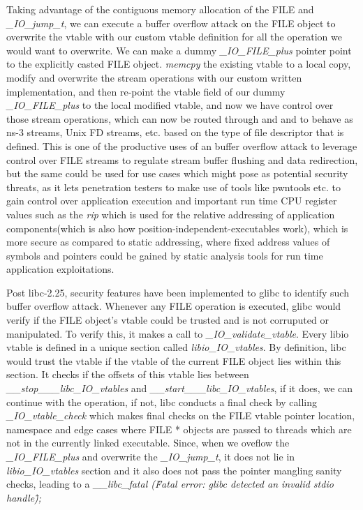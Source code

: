 \documentclass{sig-alternate}
\begin{document}
Taking advantage of the contiguous memory allocation of the FILE and \textit{\_IO\_jump\_t}, we can execute a buffer overflow attack on the FILE object 
to overwrite the vtable with our custom vtable definition for all the operation we would want to overwrite. We can make a dummy \textit{\_IO\_FILE\_plus} 
pointer point to the explicitly casted FILE object. \textit{memcpy} the existing vtable to a local copy, modify and overwrite the stream operations with our 
custom written implementation, and then re-point the vtable field of our dummy \textit{\_IO\_FILE\_plus} to the local modified vtable, and now we have 
control over those stream operations, which can now be routed through and and to behave as ns-3 streams, Unix FD streams, etc. based on the type of file 
descriptor that is defined. This is one of the productive uses of an buffer overflow attack to leverage control over FILE streams to regulate stream 
buffer flushing and data redirection, but the same could be used for use cases which might pose as potential security threats, as it lets penetration 
testers to make use of tools like pwntools etc. to gain control over application execution and important run time CPU register values such as the 
\textit{rip} which is used for the relative addressing of application components(which is also how position-independent-executables work), which is more 
secure as compared to static addressing, where fixed address values of symbols and pointers could be gained by static analysis tools for run 
time application exploitations.

Post libc-2.25, security features have been implemented to glibc to identify such buffer overflow attack. Whenever any FILE operation is executed, glibc 
would verify if the FILE object's vtable could be trusted and is not corruputed or manipulated. To verify this, it makes a call to 
\textit{\_IO\_validate\_vtable}. Every libio vtable is defined in a unique section called \textit{libio\_IO\_vtables}. By definition, libc would trust 
the vtable if the vtable of the current FILE object lies within this section. It checks if the offsets of this vtable lies between 
\textit{\_\_stop\_\_\_libc\_IO\_vtables} and \textit{\_\_start\_\_\_libc\_IO\_vtables}, if it does, we can continue with the operation, if not, libc 
conducts a final check by calling \textit{\_IO\_vtable\_check} which makes final checks on the FILE vtable pointer location, namespace and edge cases
where FILE * objects are passed to threads which are not in the currently linked executable. Since, when we oveflow the \textit{\_IO\_FILE\_plus} and 
overwrite the \textit{\_IO\_jump\_t}, it does not lie in \textit{libio\_IO\_vtables} section and it also does not pass the pointer mangling sanity checks, leading to a \textit{\_\_libc\_fatal (\"Fatal error: glibc detected an invalid stdio handle\");}
\end{document}
